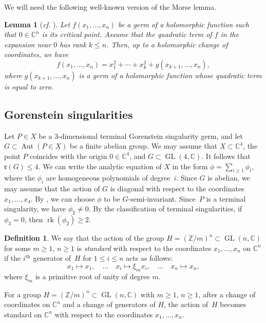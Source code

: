 \documentclass[11pt]{amsart}
\numberwithin{equation}{section}
\newtheorem{lem}[thm]{Lemma}
\theoremstyle{definition}
\newtheorem{defin}[thm]{Definition}
\theoremstyle{remark}
\DeclareMathOperator{\Aut}{Aut}
\DeclareMathOperator{\GL}{GL}
\DeclareMathOperator{\rk}{rk}
\newcommand{\supth}[1]{\ensuremath{#1^{\mathrm{th}}}}
\begin{document}
We will need the following well-known version of the Morse lemma.

\begin{lem}[\textit{cf.} {\cite[11.1]{AGV85}}]
\label{lem-corank-second-differenetial}
Let $f(x_1, \ldots, x_n)$ be a germ of a holomorphic function such that $0\in \mathbb{C}^n$ is its critical point. Assume that the quadratic term of $f$ in the  expansion near $0$ has rank $k\leq n$. Then, up to a holomorphic change of coordinates, we have
\[
f(x_{1},\ldots, x_n) = x_1^2 + \cdots + x_k^2 + g(x_{k+1},\ldots, x_n), 
\]
where $g(x_{k+1},\ldots, x_n)$ is a germ of a holomorphic function whose quadratic term is equal to zero.
\end{lem}

\subsection{Gorenstein singularities}
Let $P\in X$ be a $3$-dimensional terminal Gorenstein singularity germ, and let $G\subset \Aut(P\in X)$ be a finite abelian group.  We may assume that $X\subset \mathbb{C}^4$, the point $P$ coincides with the origin $0\in \mathbb{C}^4$, and $G \subset \GL(4, \mathbb{C})$. It follows that $\mathfrak{r}(G)\leq 4$.  We can write the analytic equation of $X$ in the form $\phi = \sum_{i\geq 1} \phi_i$, where the $\phi_i$ are homogeneous polynomials of degree~$i$. Since $G$ is abelian, we may assume that the action of $G$ is diagonal with respect to the coordinates $x_1, \ldots, x_4$. By \cite{Mo85,Re85}, we can choose $\phi$ to be $G$-semi-invariant. Since~$P$ is a terminal singularity, we have $\phi_2\neq 0$. By the classification of terminal singularities, if $\phi_3 = 0$, then $\rk(\phi_2) \geq 2$.

\begin{defin}
\label{defin-standard-action}
We say that the action of the group $H=(\mathbb{Z}/m)^n\subset \GL(n, \mathbb{C})$ for some $m\geq 1$, $n\geq 1$ is \emph{standard} with respect to the coordinates $x_1, \ldots, x_n$ on $\mathbb{C}^n$ if the $\supth{i}$ generator of~$H$ for $1\leq i\leq n$ acts as follows:
\[
x_1\longmapsto x_1, \quad \ldots \quad  x_i\longmapsto \xi_m x_i,  \quad \ldots  \quad x_n\longmapsto x_n, 
\]  
where $\xi_m$ is a primitive root of unity of degree $m$.
\end{defin}

For a group $H=(\mathbb{Z}/m)^n\subset \GL(n, \mathbb{C})$ with $m\geq 1$, $n\geq 1$, 
after a change of coordinates on $\mathbb{C}^n$ and a change of generators of $H$, the action of~$H$ becomes {standard} on $\mathbb{C}^n$ with respect to the coordinates $x_1, \ldots, x_n$.
\end{document}
